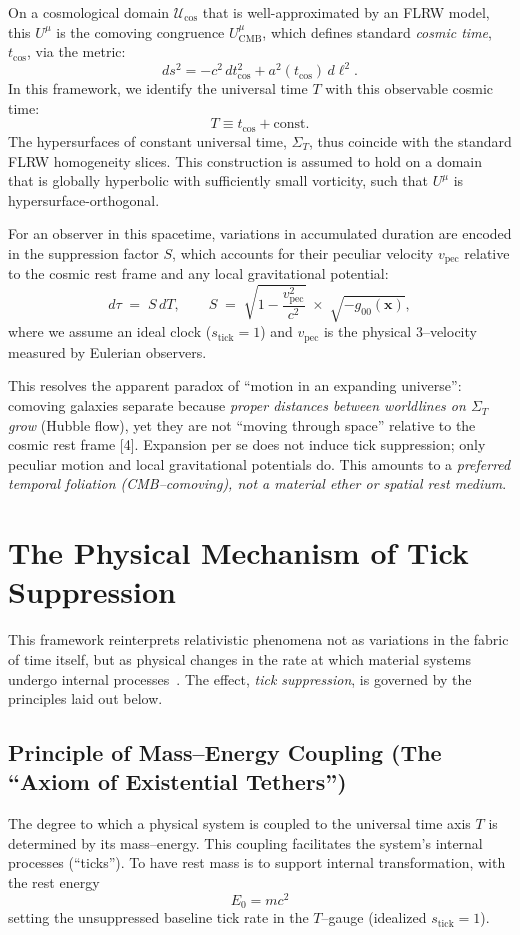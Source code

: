 \documentclass[12pt]{article}
\theoremstyle{plain} %
\begin{document}
\medskip
\noindent
On a cosmological domain $\mathcal{U}_{\mathrm{cos}}$ that is well-approximated by an FLRW model, this $U^\mu$ is the comoving congruence $U^\mu_{\mathrm{CMB}}$, which defines standard \emph{cosmic time}, $t_{\mathrm{cos}}$, via the metric:
\[
ds^2 = -c^2\,dt_{\mathrm{cos}}^2 + a^2(t_{\mathrm{cos}})\,d\ell^2.
\]
In this framework, we identify the universal time $T$ with this observable cosmic time:
\[
T \equiv t_{\mathrm{cos}} + \text{const}.
\]
The hypersurfaces of constant universal time, $\Sigma_T$, thus coincide with the standard FLRW homogeneity slices. This construction is assumed to hold on a domain that is globally hyperbolic with sufficiently small vorticity, such that $U^\mu$ is hypersurface-orthogonal.

\medskip
\noindent
For an observer in this spacetime, variations in accumulated duration are encoded in the suppression factor $S$, which accounts for their peculiar velocity $v_{\text{pec}}$ relative to the cosmic rest frame and any local gravitational potential:
\[
d\tau \;=\; S\,dT, \qquad S \;=\; \sqrt{1-\frac{v_{\text{pec}}^2}{c^2}}\;\times\;\sqrt{-g_{00}(\mathbf{x})},
\]
where we assume an ideal clock ($s_{\text{tick}}=1$) and $v_{\text{pec}}$ is the physical 3–velocity measured by Eulerian observers.

\medskip
\noindent
This resolves the apparent paradox of “motion in an expanding universe”: comoving galaxies separate because \emph{proper distances between worldlines on $\Sigma_T$ grow} (Hubble flow), yet they are not “moving through space” relative to the cosmic rest frame [4]. Expansion per se does not induce tick suppression; only peculiar motion and local gravitational potentials do. This amounts to a \emph{preferred temporal foliation (CMB–comoving), not a material ether or spatial rest medium}.
\section*{The Physical Mechanism of Tick Suppression}

This framework reinterprets relativistic phenomena not as variations in the fabric of time itself, but as physical changes in the rate at which material systems undergo internal processes~\cite{Einstein1905,Minkowski1908}. The effect, \emph{tick suppression}, is governed by the principles laid out below.

\subsection*{Principle of Mass--Energy Coupling (The ``Axiom of Existential Tethers'')}
The degree to which a physical system is coupled to the universal time axis $T$ is determined by its mass--energy. This coupling facilitates the system's internal processes (``ticks''). To have rest mass is to support internal transformation, with the rest energy
\begin{equation}
E_0 = mc^2
\label{eq:RestEnergy}
\end{equation}
setting the unsuppressed baseline tick rate in the $T$–gauge (idealized $s_{\text{tick}}=1$).  
\end{document}
